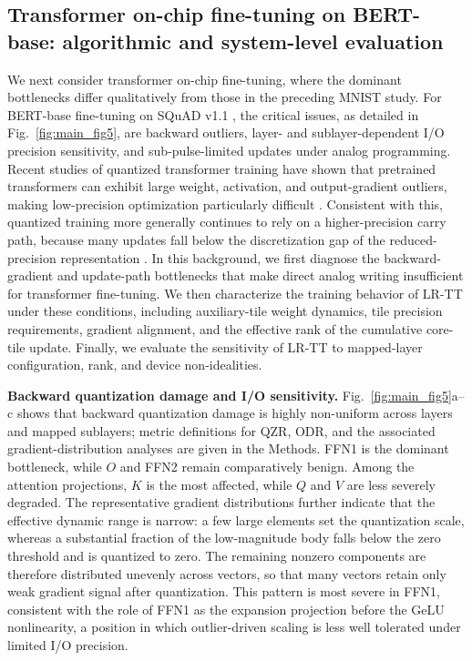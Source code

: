 \documentclass[fleqn,10pt]{wlscirep}
\begin{document}
\subsection{Transformer on-chip fine-tuning on BERT-base: algorithmic and system-level evaluation}
\label{subsec:results_transformer}


\noindent
We next consider transformer on-chip fine-tuning, where the dominant bottlenecks differ qualitatively from those in the preceding MNIST study. For BERT-base \cite{devlin2019bert} fine-tuning on SQuAD v1.1 \cite{rajpurkar2016squad}, the critical issues, as detailed in Fig.~\ref{fig:main_fig5}, are backward outliers, layer- and sublayer-dependent I/O precision sensitivity, and sub-pulse-limited updates under analog programming. Recent studies of quantized transformer training have shown that pretrained transformers can exhibit large weight, activation, and output-gradient outliers, making low-precision optimization particularly difficult \cite{ashkboos2025halo,bondarenko-etal-2021-understanding,xi2023training}. Consistent with this, quantized training more generally continues to rely on a higher-precision carry path, because many updates fall below the discretization gap of the reduced-precision representation \cite{nikdan2026eco}. In this background, we first diagnose the backward-gradient and update-path bottlenecks that make direct analog writing insufficient for transformer fine-tuning. We then characterize the training behavior of LR-TT under these conditions, including auxiliary-tile weight dynamics, tile precision requirements, gradient alignment, and the effective rank of the cumulative core-tile update. Finally, we evaluate the sensitivity of LR-TT to mapped-layer configuration, rank, and device non-idealities.

\noindent\textbf{Backward quantization damage and I/O sensitivity.}
Fig.~\ref{fig:main_fig5}a--c shows that backward quantization damage is highly non-uniform across layers and mapped sublayers; metric definitions for QZR, ODR, and the associated gradient-distribution analyses are given in the Methods. FFN1 is the dominant bottleneck, while \(O\) and FFN2 remain comparatively benign. Among the attention projections, \(K\) is the most affected, while \(Q\) and \(V\) are less severely degraded. The representative gradient distributions further indicate that the effective dynamic range is narrow: a few large elements set the quantization scale, whereas a substantial fraction of the low-magnitude body falls below the zero threshold and is quantized to zero. The remaining nonzero components are therefore distributed unevenly across vectors, so that many vectors retain only weak gradient signal after quantization. This pattern is most severe in FFN1, consistent with the role of FFN1 as the expansion projection before the GeLU nonlinearity, a position in which outlier-driven scaling is less well tolerated under limited I/O precision.
\end{document}

